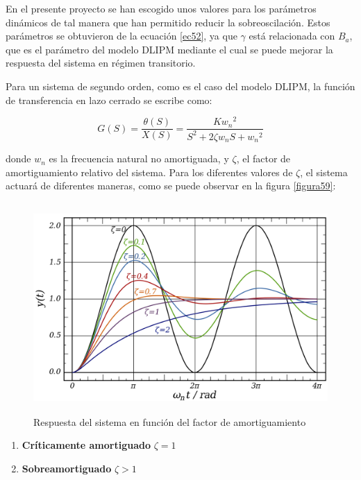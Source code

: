 \begin{itemize}
En el presente proyecto se han escogido unos valores para los parámetros dinámicos de tal manera que han permitido reducir la sobreoscilación. Estos parámetros se obtuvieron de la ecuación \ref{ec52}, ya que $\gamma$ está relacionada con $B_a$, que es el parámetro del modelo DLIPM mediante el cual se puede mejorar la respuesta del sistema en régimen transitorio.

Para un sistema de segundo orden, como es el caso del modelo DLIPM, la función de transferencia en lazo cerrado se escribe como:

\begin{equation}
G(S)=\frac{\theta(S)}{X(S)}=\frac{K{w_{n}}^{2}}{S^{2} + 2\zeta w_{n}S + {w_{n}}^{2}}
\label{ec58}
\end{equation}

donde $w_{n}$ es la frecuencia natural no amortiguada, y $\zeta$, el factor de amortiguamiento relativo del sistema. Para los diferentes valores de $\zeta$, el sistema actuará de diferentes maneras, como se puede observar en la figura \ref{figura59}:

\begin{figure}[H]
\centering
\includegraphics[width=13cm, height=8cm]{imagenes/apartado_5/510_zeta_response_system}
\caption{Respuesta del sistema en función del factor de amortiguamiento}
\label{figura510}
\end{figure}


\begin{enumerate}

\item \textbf{Críticamente amortiguado} $\zeta = 1$

\item \textbf{Sobreamortiguado} $\zeta > 1$


\end{enumerate}
\end{itemize}
